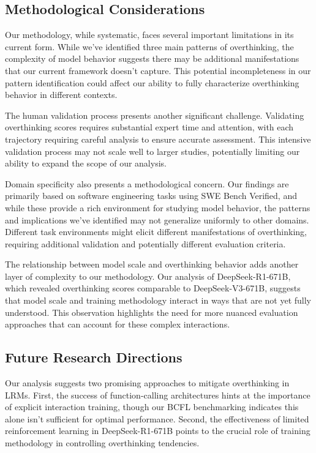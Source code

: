 \subsection{Methodological Considerations}
Our methodology, while systematic, faces several important limitations in its current form. While we've identified three main patterns of overthinking, the complexity of model behavior suggests there may be additional manifestations that our current framework doesn't capture. This potential incompleteness in our pattern identification could affect our ability to fully characterize overthinking behavior in different contexts.

The human validation process presents another significant challenge. Validating overthinking scores requires substantial expert time and attention, with each trajectory requiring careful analysis to ensure accurate assessment. This intensive validation process may not scale well to larger studies, potentially limiting our ability to expand the scope of our analysis.

Domain specificity also presents a methodological concern. Our findings are primarily based on software engineering tasks using SWE Bench Verified, and while these provide a rich environment for studying model behavior, the patterns and implications we've identified may not generalize uniformly to other domains. Different task environments might elicit different manifestations of overthinking, requiring additional validation and potentially different evaluation criteria.

The relationship between model scale and overthinking behavior adds another layer of complexity to our methodology. Our analysis of DeepSeek-R1-671B, which revealed overthinking scores comparable to DeepSeek-V3-671B, suggests that model scale and training methodology interact in ways that are not yet fully understood. This observation highlights the need for more nuanced evaluation approaches that can account for these complex interactions.

\subsection{Future Research Directions}
Our analysis suggests two promising approaches to mitigate overthinking in LRMs. First, the success of function-calling architectures hints at the importance of explicit interaction training, though our BCFL benchmarking indicates this alone isn't sufficient for optimal performance. Second, the effectiveness of limited reinforcement learning in DeepSeek-R1-671B points to the crucial role of training methodology in controlling overthinking tendencies.

